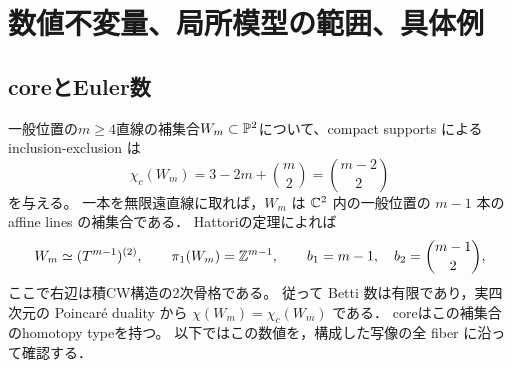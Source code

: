 \section{数値不変量、局所模型の範囲、具体例}\label{sec:examples}

\subsection{coreとEuler数}
一般位置の$m\ge4$直線の補集合$W_m\subset\mathbb P^2$について、compact supports による inclusion-exclusion は
\[
\chi_c(W_m)=3-2m+\binom m2=\binom{m-2}{2}
\]
を与える。
一本を無限遠直線に取れば，$W_m$ は $\mathbb C^2$ 内の一般位置の $m-1$ 本の affine lines の補集合である．
Hattoriの定理\cite{Hattori,PapadimaSuciu}によれば
\[
W_m\simeq(T^{m-1})^{(2)},\qquad
\pi_1(W_m)=\mathbb Z^{m-1},\qquad
b_1=m-1,\quad b_2=\binom{m-1}{2},
\]
ここで右辺は積CW構造の2次骨格である。
従って Betti 数は有限であり，実四次元の Poincar\'e duality から
$\chi(W_m)=\chi_c(W_m)$ である．
coreはこの補集合のhomotopy typeを持つ。
以下ではこの数値を，構成した写像の全 fiber に沿って確認する．

